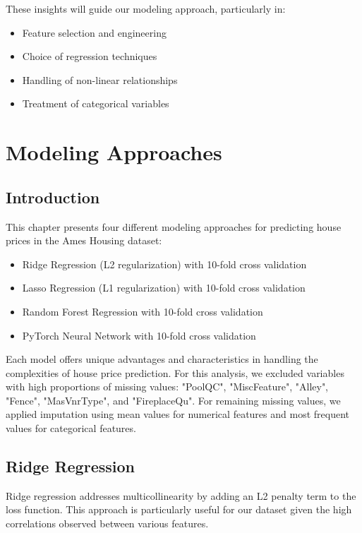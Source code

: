 \documentclass[12pt]{report}
\begin{document}
These insights will guide our modeling approach, particularly in:
\begin{itemize}
    \item Feature selection and engineering
    \item Choice of regression techniques
    \item Handling of non-linear relationships
    \item Treatment of categorical variables
\end{itemize}

\chapter{Modeling Approaches}

\section{Introduction}
This chapter presents four different modeling approaches for predicting house prices in the Ames Housing dataset:
\begin{itemize}
    \item Ridge Regression (L2 regularization) with 10-fold cross validation
    \item Lasso Regression (L1 regularization) with 10-fold cross validation
    \item Random Forest Regression with 10-fold cross validation
    \item PyTorch Neural Network with 10-fold cross validation
\end{itemize}

Each model offers unique advantages and characteristics in handling the complexities of house price prediction.
For this analysis, we excluded variables with high proportions of missing values: "PoolQC", "MiscFeature", "Alley", "Fence", "MasVnrType", and "FireplaceQu". For remaining missing values, we applied imputation using mean values for numerical features and most frequent values for categorical features.

\section{Ridge Regression}
Ridge regression addresses multicollinearity by adding an L2 penalty term to the loss function. This approach is particularly useful for our dataset given the high correlations observed between various features.
\end{document}
